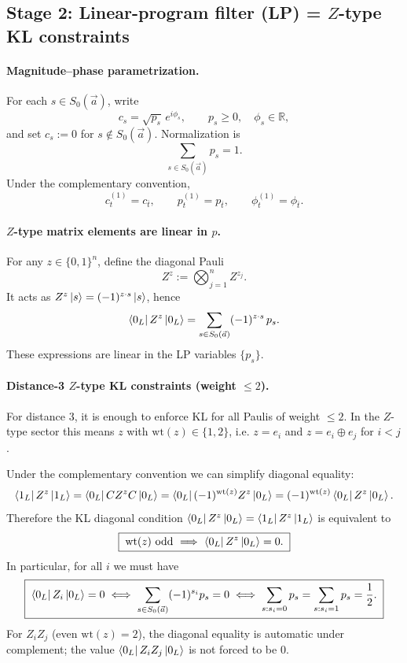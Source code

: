 \documentclass[11pt]{article}
\begin{document}
\subsection{Stage 2: Linear-program filter (LP) = \(Z\)-type KL constraints}

\paragraph{Magnitude--phase parametrization.}
For each \(s\in S_0(\vec a)\), write
\[
c_s=\sqrt{p_s}\,e^{i\phi_s},
\qquad p_s\ge 0,\quad \phi_s\in\mathbb{R},
\]
and set \(c_s:=0\) for \(s\notin S_0(\vec a)\).
Normalization is
\[
\boxed{\;\sum_{s\in S_0(\vec a)} p_s = 1.\;}
\]
Under the complementary convention,
\[
c^{(1)}_t=c_{\overline{t}},
\qquad
p^{(1)}_t=p_{\overline{t}},
\qquad
\phi^{(1)}_t=\phi_{\overline{t}}.
\]

\paragraph{\(Z\)-type matrix elements are linear in \(p\).}
For any \(z\in\{0,1\}^n\), define the diagonal Pauli
\[
Z^z := \bigotimes_{j=1}^n Z^{z_j}.
\]
It acts as \(Z^z\ket{s}=(-1)^{z\cdot s}\ket{s}\), hence
\[
\bra{0_L}Z^z\ket{0_L}=\sum_{s\in S_0(\vec a)} (-1)^{z\cdot s}\,p_s.
\]
These expressions are linear in the LP variables \(\{p_s\}\).

\paragraph{Distance-3 \(Z\)-type KL constraints (weight \(\le 2\)).}
For distance \(3\), it is enough to enforce KL for all Paulis of weight \(\le 2\).
In the \(Z\)-type sector this means \(z\) with \(\mathrm{wt}(z)\in\{1,2\}\), i.e.
\(z=e_i\) and \(z=e_i\oplus e_j\) for \(i<j\).

Under the complementary convention we can simplify diagonal equality:
\[
\bra{1_L}Z^z\ket{1_L}
=\bra{0_L}C Z^z C\ket{0_L}
=\bra{0_L}(-1)^{\mathrm{wt}(z)}Z^z\ket{0_L}
=(-1)^{\mathrm{wt}(z)}\bra{0_L}Z^z\ket{0_L}.
\]
Therefore the KL diagonal condition
\(\bra{0_L}Z^z\ket{0_L}=\bra{1_L}Z^z\ket{1_L}\) is equivalent to
\[
\boxed{\;\mathrm{wt}(z)\ \text{odd}\ \Longrightarrow\ \bra{0_L}Z^z\ket{0_L}=0.\;}
\]
In particular, for all \(i\) we must have
\[
\boxed{\;\bra{0_L}Z_i\ket{0_L}=0
\iff
\sum_{s\in S_0(\vec a)}(-1)^{s_i}p_s=0
\iff
\sum_{s:s_i=0}p_s=\sum_{s:s_i=1}p_s=\frac12.\;}
\]
For \(Z_iZ_j\) (even \(\mathrm{wt}(z)=2\)), the diagonal equality is automatic under complement; the value \(\bra{0_L}Z_iZ_j\ket{0_L}\) is not forced to be \(0\).
\end{document}
